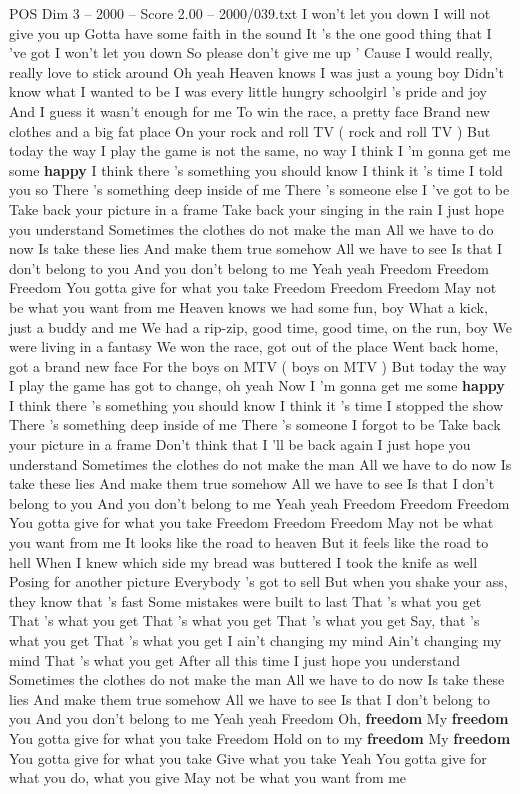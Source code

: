\begin{textsample}{POS Dim 3 – 2000 – Score 2.00 – 2000/039.txt}  \label{ex:f3_pos_034}
I won't let you down I will not give you up Gotta have some faith in the sound It 's the one good thing that I 've got I won't let you down So please don't give me up ' Cause I would really, really love to stick around Oh yeah Heaven knows I was just a young boy Didn't know what I wanted to be I was every little hungry schoolgirl 's pride and joy And I guess it wasn't enough for me To win the race, a pretty face Brand new clothes and a big fat place On your rock and roll TV ( rock and roll TV ) But today the way I play the game is not the same, no way I think I 'm gonna get me some \textbf{happy} I think there 's something you should know I think it 's time I told you so There 's something deep inside of me There 's someone else I 've got to be Take back your picture in a frame Take back your singing in the rain I just hope you understand Sometimes the clothes do not make the man All we have to do now Is take these lies And make them true somehow All we have to see Is that I don't belong to you And you don't belong to me Yeah yeah Freedom Freedom Freedom You gotta give for what you take Freedom Freedom Freedom May not be what you want from me Heaven knows we had some fun, boy What a kick, just a buddy and me We had a rip-zip, good time, good time, on the run, boy We were living in a fantasy We won the race, got out of the place Went back home, got a brand new face For the boys on MTV ( boys on MTV ) But today the way I play the game has got to change, oh yeah Now I 'm gonna get me some \textbf{happy} I think there 's something you should know I think it 's time I stopped the show There 's something deep inside of me There 's someone I forgot to be Take back your picture in a frame Don't think that I 'll be back again I just hope you understand Sometimes the clothes do not make the man All we have to do now Is take these lies And make them true somehow All we have to see Is that I don't belong to you And you don't belong to me Yeah yeah Freedom Freedom Freedom You gotta give for what you take Freedom Freedom Freedom May not be what you want from me It looks like the road to heaven But it feels like the road to hell When I knew which side my bread was buttered I took the knife as well Posing for another picture Everybody 's got to sell But when you shake your ass, they know that 's fast Some mistakes were built to last That 's what you get That 's what you get That 's what you get That 's what you get Say, that 's what you get That 's what you get I ain't changing my mind Ain't changing my mind That 's what you get After all this time I just hope you understand Sometimes the clothes do not make the man All we have to do now Is take these lies And make them true somehow All we have to see Is that I don't belong to you And you don't belong to me Yeah yeah Freedom Oh, \textbf{freedom} My \textbf{freedom} You gotta give for what you take Freedom Hold on to my \textbf{freedom} My \textbf{freedom} You gotta give for what you take Give what you take Yeah You gotta give for what you do, what you give May not be what you want from me

\end{textsample}

